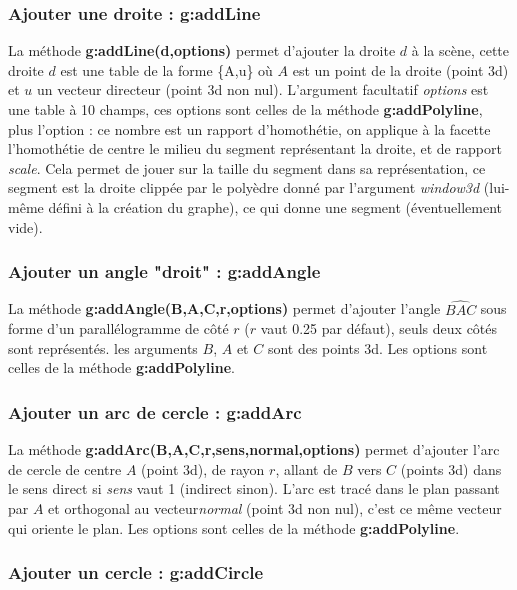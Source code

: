 \documentclass[%
10pt,%
a4paper,%
french,%
]%
{article}%
\begin{document}
\subsubsection{Ajouter une droite : g:addLine}

La méthode \textbf{g:addLine(d,options)} permet d'ajouter la droite $d$ à la scène, cette droite $d$ est une table de la forme \{A,u\} où $A$ est un point de la droite (point 3d) et $u$ un vecteur directeur (point 3d non nul).  L'argument facultatif \emph{options} est une table à 10 champs, ces options sont celles de la méthode \textbf{g:addPolyline}, plus l'option  : ce nombre est un rapport d'homothétie, on applique à la facette l'homothétie de centre le milieu du segment représentant la droite, et de rapport \emph{scale}. Cela permet de jouer sur la taille du segment dans sa représentation, ce segment est la droite clippée par le polyèdre donné par l'argument \emph{window3d} (lui-même défini à la création du graphe), ce qui donne une segment (éventuellement vide).

\subsubsection{Ajouter un angle "droit" : g:addAngle}

La méthode \textbf{g:addAngle(B,A,C,r,options)} permet d'ajouter l'angle $\widehat{BAC}$ sous forme d'un parallélogramme de côté $r$ ($r$ vaut 0.25 par défaut), seuls deux côtés sont représentés. les arguments $B$, $A$ et $C$ sont des points 3d. Les options sont celles de la méthode \textbf{g:addPolyline}.

\subsubsection{Ajouter un arc de cercle : g:addArc}

La méthode \textbf{g:addArc(B,A,C,r,sens,normal,options)} permet d'ajouter l'arc de cercle de centre $A$ (point 3d), de rayon $r$, allant de $B$ vers $C$ (points 3d) dans le sens direct si \emph{sens} vaut 1 (indirect sinon). L'arc est tracé dans le plan passant par $A$ et orthogonal au vecteur\emph{normal} (point 3d non nul), c'est ce même vecteur qui oriente le plan. Les options sont celles de la méthode \textbf{g:addPolyline}.

\subsubsection{Ajouter un cercle : g:addCircle}
\end{document}
